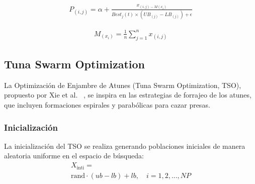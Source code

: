 \documentclass[conference]{IEEEtran}
\begin{document}
\begin{equation}
	\begin{gathered}
		P_{(i,j)}=\alpha + \frac{x_{(i,j) - M(x_i)}}{Best_j(t) \times (UB_{(j)}-LB_{(j)})+\epsilon} 
	\end{gathered}
	\label{eq38}
\end{equation}

\begin{equation}
	\begin{gathered}
		M_{(x_i)} = \frac{1}{n} \sum_{j=1}^{n} x_{(i,j)}
	\end{gathered}
	\label{eq39}
\end{equation}

\subsection{Tuna Swarm Optimization}



\noindent La Optimización de Enjambre de Atunes (Tuna Swarm Optimization, TSO), propuesto por  Xie et al. ~\cite{Xie2021}, se inspira en las estrategias de forrajeo de los atunes, que incluyen formaciones espirales y parabólicas para cazar presas.

\subsubsection{Inicialización}

\noindent La inicialización del TSO se realiza generando poblaciones iniciales de manera aleatoria uniforme en el espacio de búsqueda:
\begin{equation}
	\begin{gathered}
		X_{\text{inti}}= 
		\\ %
		\text{rand} \cdot (ub - lb) + lb, \quad i = 1, 2, ..., NP
	\end{gathered}
\end{equation}
\end{document}
